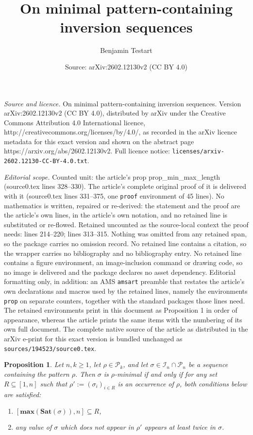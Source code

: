 \documentclass[10pt,a4paper]{amsart}
\title{On minimal pattern-containing inversion sequences}
\author{Benjamin Testart}
\date{Source: arXiv:2602.12130v2 (CC BY 4.0)}
\newtheorem{prop}{Proposition}
\newcommand{\I}{\mathcal{I}}
\renewcommand{\P}{\mathcal{P}}
\newcommand{\Sat}{\mathbf{Sat}}
\renewcommand{\max}{\mathbf{max}}
\begin{document}
\maketitle

\noindent\emph{Source and licence.} On minimal pattern-containing inversion sequences. Version arXiv:2602.12130v2 (CC BY 4.0), distributed by arXiv under the Creative Commons Attribution 4.0 International licence, http://creativecommons.org/licenses/by/4.0/, as recorded in the arXiv licence metadata for this exact version and shown on the abstract page https://arxiv.org/abs/2602.12130v2. Full licence notice: \texttt{licenses/arxiv-2602.12130-CC-BY-4.0.txt}.\par\smallskip

\noindent\textit{Editorial scope.} Counted unit: the article's prop prop\_min\_max\_length (source0.tex lines 328--330). The article's complete original proof of it is delivered with it (source0.tex lines 331--375, one \texttt{proof} environment of 45 lines). No mathematics is written, repaired or re-derived: the statement and the proof are the article's own lines, in the article's own notation, and no retained line is substituted or re-flowed.  Retained uncounted as the source-local context the proof needs: lines 214--220; lines 313--315.  Nothing was omitted from any retained span, so the package carries no omission record.  No retained line contains a citation, so the wrapper carries no bibliography and no bibliography entry.  No retained line contains a figure environment, an image-inclusion command or drawing code, so no image is delivered and the package declares no asset dependency.  Editorial formatting only, in addition: an AMS \texttt{amsart} preamble that restates the article's own declarations and macros used by the retained lines, namely the environments \texttt{prop} on separate counters, together with the standard packages those lines need.  The retained environments print in this document as Proposition 1 in order of appearance, whereas the article prints the same items with the numbering of its own full document.  The complete native source of the article as distributed in the arXiv e-print for this exact version is bundled unchanged as \texttt{sources/194523/source0.tex}.
\begin{prop} \label{prop_minimal_characterization}
    Let $n,k \geq 1$, let $\rho \in \P_k$, and let $\sigma \in \I_n \cap \P_n$ be a sequence containing the pattern $\rho$. Then $\sigma$ is $\rho$-minimal if and only if for any set $R \subseteq [1,n]$ such that $\rho' := (\sigma_{i})_{i \in R}$ is an occurrence of $\rho$, both conditions below are satisfied:
    \begin{enumerate}
        \item $[\max(\Sat(\sigma)),n] \subseteq R$,
        \item any value of $\sigma$ which does not appear in $\rho'$ appears at least twice in $\sigma$.
    \end{enumerate}
\end{prop}
\end{document}
